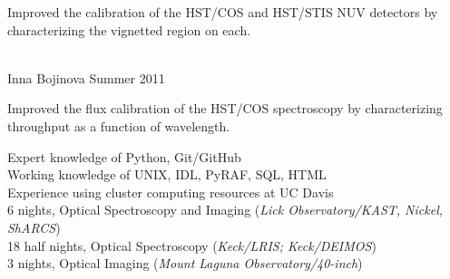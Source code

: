 \documentclass[10pt]{cv}
\begin{document}
\begin{llist}
\begin{minipage}[l]{0.7\textwidth}\vspace{0.15cm}
Improved the calibration of the HST/COS and HST/STIS NUV detectors by characterizing the vignetted region on each.\\
\end{minipage}\vspace{0.15cm}
\\
Inna Bojinova \hfill Summer 2011\\
\begin{minipage}[l]{0.7\textwidth}\vspace{0.15cm}
Improved the flux calibration of the HST/COS spectroscopy by characterizing throughput as a function of wavelength.\\
\end{minipage}\vspace{0.15cm}
\vspace{-0.1in}  
Expert knowledge of Python, Git/GitHub\\
Working knowledge of UNIX, IDL, PyRAF, SQL, HTML\\
Experience using cluster computing resources at UC Davis\\ 
%
\vspace{-0.1in}   
6 nights, Optical Spectroscopy and Imaging ({\it Lick Observatory/KAST, Nickel, ShARCS})\\
18 half nights, Optical Spectroscopy ({\it Keck/LRIS; Keck/DEIMOS})\\
3 nights, Optical Imaging ({\it Mount Laguna Observatory/40-inch})
%

\end{llist}
\end{document}
